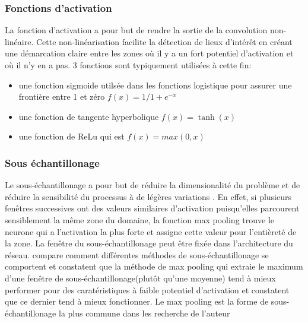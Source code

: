     \subsubsection{Fonctions d'activation}\label{sssection:activ_fn}
    La fonction d'activation a pour but de rendre la sortie de la convolution non-linéaire. Cette non-linéarisation facilite la détection de lieux d'intérêt en créant une démarcation claire entre les zones où il y a un fort potentiel d'activation et où il n'y en a pas. 3 fonctions sont typiquement utilisées à cette fin: 
      \begin{itemize}
        \item une fonction sigmoide utilsée dans les fonctions logistique pour assurer une frontière entre 1 et zéro $f(x) = 1/1+ e^{-x} $
        \item une fonction de tangente hyperbolique $f(x) = \tanh(x) $ 
        \item une fonction de \ac{ReLu} qui est $f(x)  = max(0,x) $
      \end{itemize}
    \subsubsection{Sous échantillonage}
    Le sous-échantillonage a pour but de réduire la dimensionalité du problème et de réduire la sensibilité du processus à de légères variations \parencite{lecun_convolutional_1995}. En effet, si plusieurs fenêtres successives ont des valeurs similaires d'activation puisqu'elles parcourent sensiblement la même zone du domaine, la fonction max pooling trouve le neurone qui a l'activation la plus forte et assigne cette valeur pour l'entièreté de la zone. La fenêtre du sous-échantillonage peut être fixée dans l'architecture du réseau. \textcite{boureau_theoretical_2010} compare comment différentes méthodes de sous-échantillonage se comportent et constatent que la méthode de max pooling qui extraie le maximum d'une fenêtre de sous-échantillonage(plutôt qu'une moyenne) tend à mieux performer pour des caratéristiques à faible potentiel d'activation et constatent que ce dernier tend à mieux fonctionner. Le max pooling est la forme de sous-échantillonage la plus commune dans les recherche de l'auteur \parencite{ronneberger_u-net_2015, he_deep_2016}
